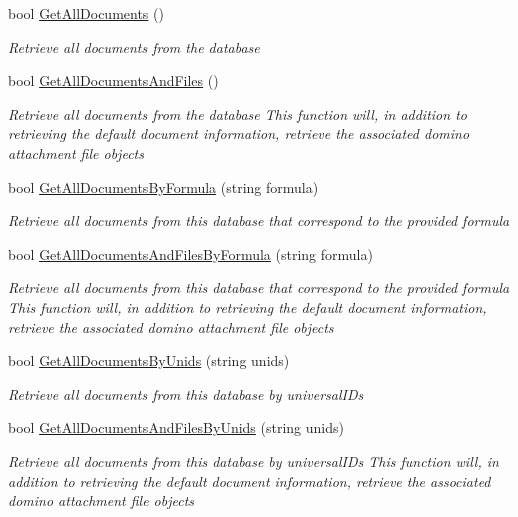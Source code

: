 \begin{DoxyCompactItemize}
bool \mbox{\hyperlink{class_database_object_ad3010e55b2e75d0863e168fed1e279c5}{Get\+All\+Documents}} ()
\begin{DoxyCompactList}\small\item\em Retrieve all documents from the database \end{DoxyCompactList}\item 
bool \mbox{\hyperlink{class_database_object_a72239fa2b2a549665e45cdd340cd70a0}{Get\+All\+Documents\+And\+Files}} ()
\begin{DoxyCompactList}\small\item\em Retrieve all documents from the database This function will, in addition to retrieving the default document information, retrieve the associated domino attachment file objects \end{DoxyCompactList}\item 
bool \mbox{\hyperlink{class_database_object_a6bfb480373a7e2bdbeaa67e4e3303a3a}{Get\+All\+Documents\+By\+Formula}} (string formula)
\begin{DoxyCompactList}\small\item\em Retrieve all documents from this database that correspond to the provided formula \end{DoxyCompactList}\item 
bool \mbox{\hyperlink{class_database_object_ac478ff9264805edc8569d510916c4c00}{Get\+All\+Documents\+And\+Files\+By\+Formula}} (string formula)
\begin{DoxyCompactList}\small\item\em Retrieve all documents from this database that correspond to the provided formula This function will, in addition to retrieving the default document information, retrieve the associated domino attachment file objects \end{DoxyCompactList}\item 
bool \mbox{\hyperlink{class_database_object_a4d8a7d73614f53a04fe8eb79bef2f614}{Get\+All\+Documents\+By\+Unids}} (string unids)
\begin{DoxyCompactList}\small\item\em Retrieve all documents from this database by universal\+I\+Ds \end{DoxyCompactList}\item 
bool \mbox{\hyperlink{class_database_object_a9332713c924ab14195fe51bf0b8d35d1}{Get\+All\+Documents\+And\+Files\+By\+Unids}} (string unids)
\begin{DoxyCompactList}\small\item\em Retrieve all documents from this database by universal\+I\+Ds This function will, in addition to retrieving the default document information, retrieve the associated domino attachment file objects \end{DoxyCompactList}\item 

\end{DoxyCompactItemize}
